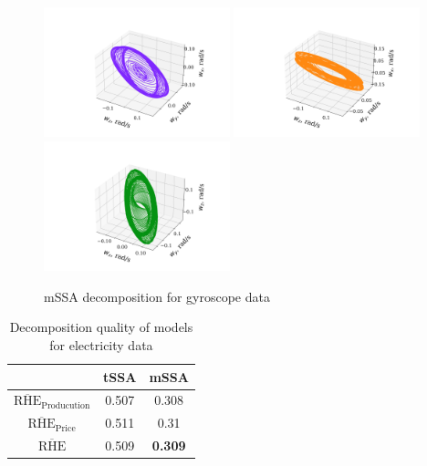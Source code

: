 \documentclass[referee, pdflatex]{sn-jnl}
\theoremstyle{definition}
\theoremstyle{plain}
\begin{document}
	\begin{figure}[h]
		\centering
		\includegraphics[width=0.48\textwidth, keepaspectratio]{../../experiments/motion/mssa/figs/decomposition/manual/grouping_2/gyro_1.png}
		\includegraphics[width=0.48\textwidth, keepaspectratio]{../../experiments/motion/mssa/figs/decomposition/manual/grouping_2/gyro_2.png}
		\includegraphics[width=0.48\textwidth, keepaspectratio]{../../experiments/motion/mssa/figs/decomposition/manual/grouping_2/gyro_3.png}
		\caption{mSSA decomposition for gyroscope data}\label{fig:gyro_decomp_mssa}
	\end{figure}
	
	\def\arraystretch{1.2}
	\begin{table}[h!]
		\centering
		\caption{Decomposition quality of models for electricity data}\label{tab:decomp_electr_results}
		\begin{tabular}{|c|c|c|}
			\hline
			& tSSA  & mSSA           \\ \hline
			$ \overline{\text{RHE}}_{\text{Producution}} $  & 0.507 & 0.308          \\ \hline
			$ \overline{\text{RHE}}_{\text{Price}} $      & 0.511 & 0.31           \\ \hline
			$ \overline{\text{RHE}} $             & 0.509 & \textbf{0.309} \\ \hline
		\end{tabular}
	\end{table}
	
\end{document}
